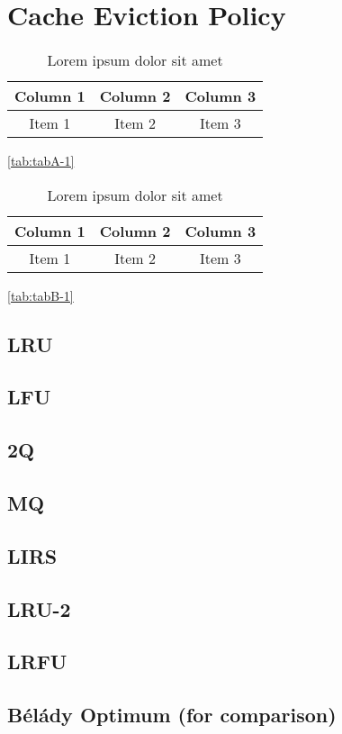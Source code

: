 \lipsum[1-1] \cite{reference-3}

\section{Cache Eviction Policy}

\begin{table}[ht!]
    \centering
    \begin{tabular}{c c c}
        \hline
        Column 1 & Column 2 & Column 3 \\
        \hline
        Item 1   & Item 2   & Item 3   \\
    \end{tabular}
    \caption{Lorem ipsum dolor sit amet}
    \label{tab:tabA-2}
\end{table}

\lipsum[1-1] \ref{tab:tabA-1}

\begin{table}[ht!]
    \centering
    \begin{tabular}{c c c}
        \hline
        Column 1 & Column 2 & Column 3 \\
        \hline
        Item 1   & Item 2   & Item 3   \\
    \end{tabular}
    \caption{Lorem ipsum dolor sit amet}
    \label{tab:tabB-2}
\end{table}

\lipsum[1-1] \ref{tab:tabB-1}

\subsection{LRU}

\subsection{LFU}

\subsection{2Q}

\subsection{MQ}

\subsection{LIRS}

\subsection{LRU-2}

\subsection{LRFU}

\subsection{Bélády Optimum (for comparison)}

\lipsum[1-2]